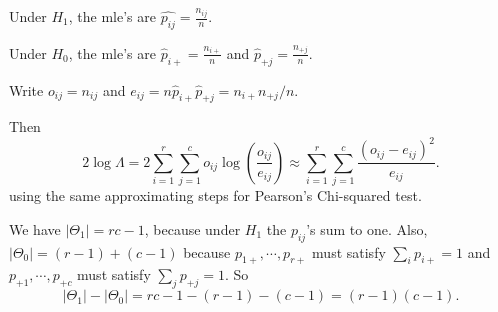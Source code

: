 \documentclass[a4paper]{article}
\begin{document}
Under $H_1$, the mle's are $\hat{p_{ij}} = \frac{n_{ij}}{n}$.

Under $H_0$, the mle's are $\hat{p}_{i+} = \frac{n_{i+}}{n}$ and $\hat{p}_{+j} = \frac{n_{+j}}{n}$.

Write $o_{ij} = n_{ij}$ and $e_{ij} = n\hat{p}_{i+}\hat{p}_{+j} = n_{i+}n_{+j}/n$.

Then
\[
  2\log \Lambda = 2\sum_{i = 1}^r \sum_{j = 1}^c o_{ij}\log\left(\frac{o_{ij}}{e_{ij}}\right) \approx \sum_{i = 1}^r \sum_{j = 1}^c \frac{(o_{ij} - e_{ij})^2}{e_{ij}}.
\]
using the same approximating steps for Pearson's Chi-squared test.

We have $|\Theta_1| = rc - 1$, because under $H_1$ the $p_{ij}$'s sum to one. Also, $|\Theta_0| = (r - 1) + (c - 1)$ because $p_{1+}, \cdots, p_{r+}$ must satisfy $\sum_i p_{i+} = 1$ and $p_{+1}, \cdots, p_{+c}$ must satisfy $\sum_j p_{+j} = 1$. So
\[
  |\Theta_1| - |\Theta_0| = rc - 1 - (r - 1) - (c - 1) = (r - 1)(c - 1).
\]
\end{document}
